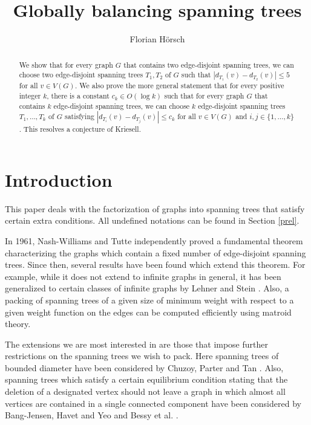 \documentclass{article}
\title{Globally balancing spanning trees}
\author{Florian H\"orsch}
\theoremstyle{plain}
\theoremstyle{nonumberplain}
\theoremstyle{nonumberplain}
\begin{document}
\maketitle
\begin{abstract}
We show that for every graph $G$ that contains two edge-disjoint spanning trees, we can choose two edge-disjoint spanning trees $T_1,T_2$ of $G$ such that $|d_{T_1}(v)-d_{T_2}(v)|\leq 5$ for all $v \in V(G)$. We also prove the more general statement that for every positive integer $k$, there is a constant $c_k \in O(\log k)$ such that for every graph $G$ that contains $k$ edge-disjoint spanning trees, we can choose $k$ edge-disjoint spanning trees $T_1,\ldots,T_k$ of $G$ satisfying $|d_{T_i}(v)-d_{T_j}(v)|\leq c_k$ for all $v \in V(G)$ and $i,j \in \{1,\ldots,k\}$. This resolves a conjecture of Kriesell.
\end{abstract}

\section{Introduction}
This paper deals with the factorization of graphs into spanning trees that satisfy certain extra conditions. All undefined notations can be found in Section \ref{prel}.

 In 1961, Nash-Williams \cite{nw} and Tutte \cite{t} independently proved a fundamental theorem characterizing the graphs which contain a fixed number of edge-disjoint spanning trees. Since then, several results have been found which extend this theorem. For example, while it does not extend to infinite graphs in general, it has been generalized to certain classes of infinite graphs by Lehner \cite{l} and Stein \cite{s}. Also, a packing of spanning trees of a given size of minimum weight with respect to a given weight function on the edges can be computed efficiently using matroid theory.

 The extensions we are most interested in are those that impose further restrictions on the spanning trees we wish to pack. Here spanning trees of bounded diameter have been considered by Chuzoy, Parter and Tan \cite{cpt}. Also, spanning trees which satisfy a certain equilibrium condition stating that the deletion of a designated vertex should not leave a graph in which almost all vertices are contained in a single connected component have been considered by Bang-Jensen, Havet and Yeo \cite{bhy} and Bessy et al. \cite{bhmrs}.
\end{document}
